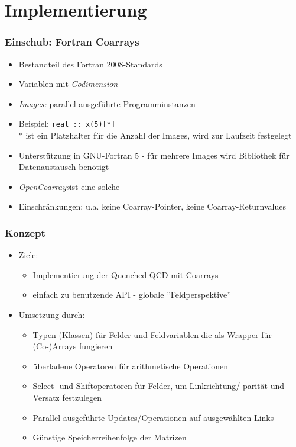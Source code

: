 \documentclass[10pt]{beamer}
\begin{document}
\section*{Implementierung}


\begin{frame}[fragile]
    \frametitle{Einschub: Fortran Coarrays}
    \begin{itemize}
        \item Bestandteil des Fortran 2008-Standards
        \item Variablen mit \emph{Codimension}
        \item \emph{Images: } parallel ausgeführte Programminstanzen
        \item Beispiel: \lstinline[basicstyle=\normalsize]{real :: x(5)[*]}{}\\
        	$*$ ist ein Platzhalter für die Anzahl der Images, wird zur Laufzeit festgelegt
        \item Unterstützung in GNU-Fortran 5 - für mehrere Images wird Bibliothek für Datenaustausch benötigt
        \item \emph{OpenCoarrays}\footnotemark ist eine solche
        \item Einschränkungen: u.a. keine Coarray-Pointer, keine Coarray-Returnvalues
    \end{itemize}
\end{frame}

\begin{frame}
    \frametitle{Konzept}
    \begin{itemize}
        \item Ziele:
        \begin{itemize}
        	\item Implementierung der Quenched-QCD mit Coarrays
        	\item einfach zu benutzende API - globale ''Feldperspektive''        	
		\end{itemize}
		\item Umsetzung durch:
        \begin{itemize}
        	\item Typen (Klassen) für Felder und Feldvariablen die als Wrapper für (Co-)Arrays fungieren
        	\item überladene Operatoren für arithmetische Operationen
        	\item Select- und Shiftoperatoren für Felder, um Linkrichtung/-parität und Versatz festzulegen
        	\item Parallel ausgeführte Updates/Operationen auf ausgewählten Links
        	\item Günstige Speicherreihenfolge der Matrizen
		\end{itemize} 
    \end{itemize}
\end{frame}
\end{document}
